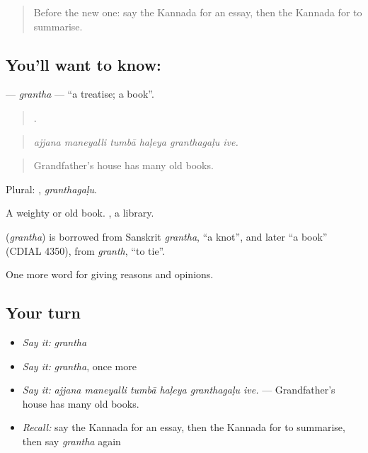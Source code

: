\label{lesson:KA-C409-grantha}



\begin{quote}
Before the new one: say the Kannada for an essay, then the Kannada for to summarise.
\end{quote}

\subsection*{You'll want to know: }
\textbf{} — \emph{grantha} — \textquotedblleft{}a treatise; a book\textquotedblright{}.

\begin{quote}
     .
\end{quote}

\begin{quote}
\emph{ajjana maneyalli tumbā haḷeya granthagaḷu ive.}
\end{quote}

\begin{quote}
Grandfather's house has many old books.
\end{quote}

Plural: , \emph{granthagaḷu}.

A weighty or old book. , a library.

\begin{cousinweb}
\textbf{} (\emph{grantha}) is borrowed from Sanskrit \emph{grantha}, \textquotedblleft{}a knot\textquotedblright{}, and later \textquotedblleft{}a book\textquotedblright{} (CDIAL 4350), from \emph{granth}, \textquotedblleft{}to tie\textquotedblright{}.
\end{cousinweb}

\begin{grammarlens}[title={What you've built}]
One more word for giving reasons and opinions.
\end{grammarlens}

\subsection*{Your turn}
\begin{itemize}
\raggedright
  \item \emph{Say it:} \emph{grantha}
  \item \emph{Say it:} \emph{grantha}, once more
  \item \emph{Say it:} \emph{ajjana maneyalli tumbā haḷeya granthagaḷu ive.} — Grandfather's house has many old books.
  \item \emph{Recall:} say the Kannada for an essay, then the Kannada for to summarise, then say \emph{grantha} again
\end{itemize}

